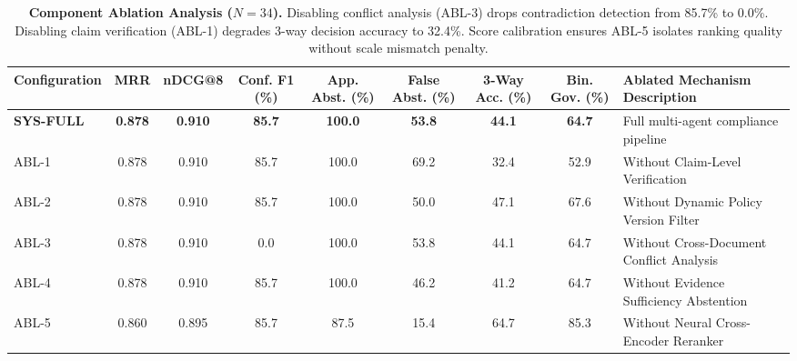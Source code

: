 \begin{table}[t]
\centering
\small
\begin{tabular}{lcccccccl}
\toprule
\textbf{Configuration} & \textbf{MRR} & \textbf{nDCG@8} & \textbf{Conf. F1 (\%)} & \textbf{App. Abst. (\%)} & \textbf{False Abst. (\%)} & \textbf{3-Way Acc. (\%)} & \textbf{Bin. Gov. (\%)} & \textbf{Ablated Mechanism Description} \\
\midrule
\textbf{SYS-FULL} & \textbf{0.878} & \textbf{0.910} & \textbf{85.7} & \textbf{100.0} & \textbf{53.8} & \textbf{44.1} & \textbf{64.7} & Full multi-agent compliance pipeline \\
ABL-1             & 0.878 & 0.910 & 85.7 & 100.0 & 69.2 & 32.4 & 52.9 & Without Claim-Level Verification \\
ABL-2             & 0.878 & 0.910 & 85.7 & 100.0 & 50.0 & 47.1 & 67.6 & Without Dynamic Policy Version Filter \\
ABL-3             & 0.878 & 0.910 & 0.0  & 100.0 & 53.8 & 44.1 & 64.7 & Without Cross-Document Conflict Analysis \\
ABL-4             & 0.878 & 0.910 & 85.7 & 100.0 & 46.2 & 41.2 & 64.7 & Without Evidence Sufficiency Abstention \\
ABL-5             & 0.860 & 0.895 & 85.7 & 87.5  & 15.4 & 64.7 & 85.3 & Without Neural Cross-Encoder Reranker \\
\bottomrule
\end{tabular}
\caption{\textbf{Component Ablation Analysis ($N=34$).} Disabling conflict analysis (ABL-3) drops contradiction detection from 85.7\% to 0.0\%. Disabling claim verification (ABL-1) degrades 3-way decision accuracy to 32.4\%. Score calibration ensures ABL-5 isolates ranking quality without scale mismatch penalty.}
\label{tab:ablation_results}
\end{table}

